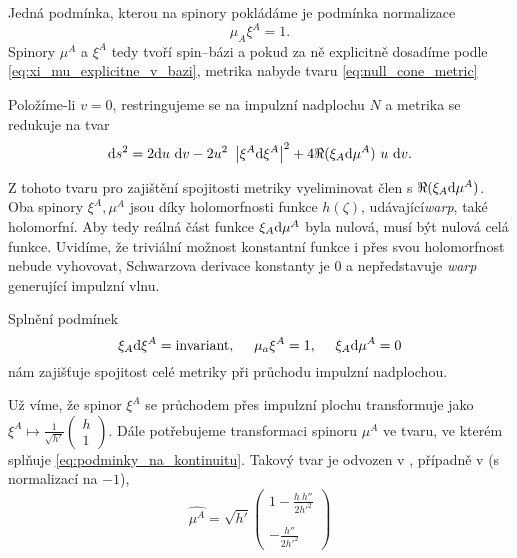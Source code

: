 Jedná podmínka, kterou na spinory pokládáme je podmínka normalizace
\begin{equation}
    \mu_A \xi^A = 1.
\end{equation}
Spinory $\mu^A$ a $\xi^A$ tedy tvoří spin--bázi a pokud za ně explicitně dosadíme podle
\eqref{eq:xi_mu_explicitne_v_bazi}, metrika nabyde tvaru \eqref{eq:null_cone_metric}

Položíme-li $v=0$, restringujeme se na impulzní nadplochu $N$ a metrika se redukuje na tvar
\begin{equation}
    \mathrm{d} s^2 = 2 \mathrm{d} u ~\mathrm{d} v - 2 u^2 ~\left| \xi^A \mathrm{d} \xi^A \right|^2 + 4 \Re(\xi_A \mathrm{d} \mu^A) ~u~ \mathrm{d} v.
\end{equation}

Z tohoto tvaru pro zajištění spojitosti metriky vyeliminovat člen s $\Re(\xi_A \mathrm{d} \mu^A)$. Oba spinory
$\xi^A, \mu^A$ jsou díky holomorfnosti funkce $h(\zeta)$, udávající\emph{warp}, také holomorfní. Aby tedy reálná část
funkce $\xi_A \mathrm{d} \mu^A$ byla nulová, musí být nulová celá funkce. Uvidíme, že triviální možnost konstantní funkce i přes svou holomorfnost
nebude vyhovovat, Schwarzova derivace konstanty je 0 a nepředstavuje \emph{warp} generující impulzní vlnu.

Splnění podmínek 
\begin{equation}
    \label{eq:podminky_na_kontinuitu}
    \xi_A \mathrm{d} \xi^A = \text{invariant}, ~~~~ \mu_a \xi^A = 1,~~~~ \xi_A \mathrm{d} \mu^A = 0
\end{equation}
nám zajišťuje spojitost celé metriky při průchodu impulzní nadplochou.

Už víme, že spinor $\xi^A$ se průchodem přes impulzní plochu transformuje jako $\xi^A \mapsto \frac{1}{\sqrt{h'}} \begin{pmatrix}
    h \\ 1
\end{pmatrix}$. Dále potřebujeme transformaci spinoru $\mu^A$ ve tvaru, ve kterém splňuje \eqref{eq:podminky_na_kontinuitu}.
Takový tvar je odvozen v \cite{scholtz_notes}, případně v \cite{Aliev2001} (s normalizací na $-1$),
\begin{equation}
    \label{eq:mu_transformace}
    \hat{\mu^A} = \sqrt{h'} \begin{pmatrix}
        1 - \frac{h ~h''}{2 h'^2} \\ ~ \\ - \frac{h''}{2 h'^2}
    \end{pmatrix}
\end{equation}

